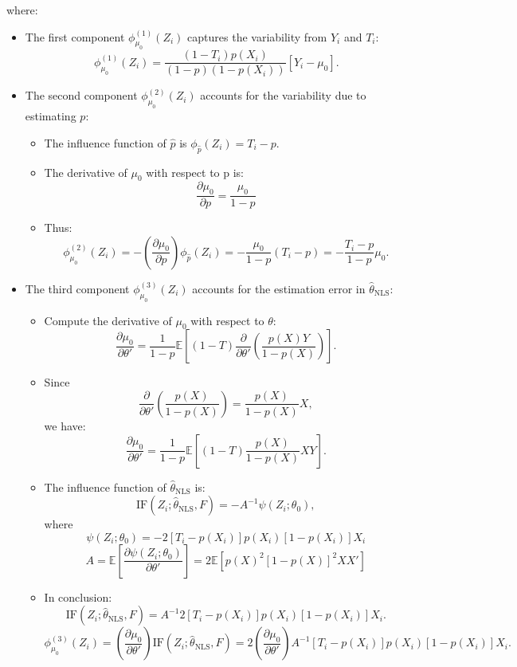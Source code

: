 \documentclass{article}
\begin{document}
where:
\begin{itemize}
    \item The first component \(\phi_{\mu_0}^{(1)}(Z_i)\) captures the variability from \(Y_i\) and \(T_i\):
    \[
    \phi_{\mu_0}^{(1)}(Z_i) = \frac{(1 - T_i) p(X_i)}{(1 - p)(1 - p(X_i))} [Y_i - \mu_0].
    \]
    \item The second component \(\phi_{\mu_0}^{(2)}(Z_i)\) accounts for the variability due to estimating \(p\):
    \begin{itemize}
      \item The influence function of $\hat{p}$ is  $\phi_{\hat{p}}(Z_i) = T_i - p$.
      \item The derivative of $\mu_0$ with respect to p is: 
      $$
      \frac{\partial \mu_0}{\partial p} = \frac{\mu_0}{1 - p}
      $$
      \item Thus:
      $$
      \phi_{\mu_0}^{(2)}(Z_i) = -\left( \frac{\partial \mu_0}{\partial p} \right) \phi_{\hat{p}}(Z_i) = -\frac{\mu_0}{1 - p} (T_i - p) = -\frac{T_i - p}{1 - p} \mu_0.
      $$
    \end{itemize}
    \item The third component \(\phi_{\mu_0}^{(3)}(Z_i)\) accounts for the estimation error in \(\hat{\theta}_{\text{NLS}}\):
    \begin{itemize}
      \item Compute the derivative of $\mu_0$ with respect to $\theta$:
      \[
      \frac{\partial \mu_0}{\partial \theta'} = \frac{1}{1 - p} \mathbb{E}\left[ (1 - T) \frac{\partial}{\partial \theta'} \left( \frac{p(X) Y}{1 - p(X)} \right) \right].
      \]
      \item Since
      $$
      \frac{\partial}{\partial \theta'} \left( \frac{p(X)}{1 - p(X)} \right) = \frac{p(X)}{1 - p(X)} X,
      $$
      we have:
      $$
      \frac{\partial \mu_0}{\partial \theta'} = \frac{1}{1 - p} \mathbb{E}\left[ (1 - T) \frac{p(X)}{1 - p(X)} X Y \right].
      $$
      \item The influence function of $\hat{\theta}_{\text{NLS}}$ is:
      \[
      \text{IF}(Z_i; \hat{\theta}_{\text{NLS}}, F) = -A^{-1} \psi(Z_i; \theta_0),
      \]
      where
      $$
      \psi(Z_i; \theta_0) = -2 [T_i - p(X_i)] p(X_i) [1 - p(X_i)] X_i
      $$
      $$
      A = \mathbb{E}\left[ \frac{\partial \psi(Z_i; \theta_0)}{\partial \theta'} \right] = 2 \mathbb{E}\left[ p(X)^2 [1 - p(X)]^2 X X' \right]
      $$
      \item In conclusion:
      $$
      \text{IF}(Z_i; \hat{\theta}_{\text{NLS}}, F) = A^{-1} 2 [T_i - p(X_i)] p(X_i) [1 - p(X_i)] X_i.
      $$
      $$
      \phi_{\mu_0}^{(3)}(Z_i) = \left( \frac{\partial \mu_0}{\partial \theta'} \right) \text{IF}(Z_i; \hat{\theta}_{\text{NLS}}, F) = 2 \left( \frac{\partial \mu_0}{\partial \theta'} \right) A^{-1} [T_i - p(X_i)] p(X_i) [1 - p(X_i)] X_i.
      $$
    \end{itemize}
\end{itemize}
\end{document}
